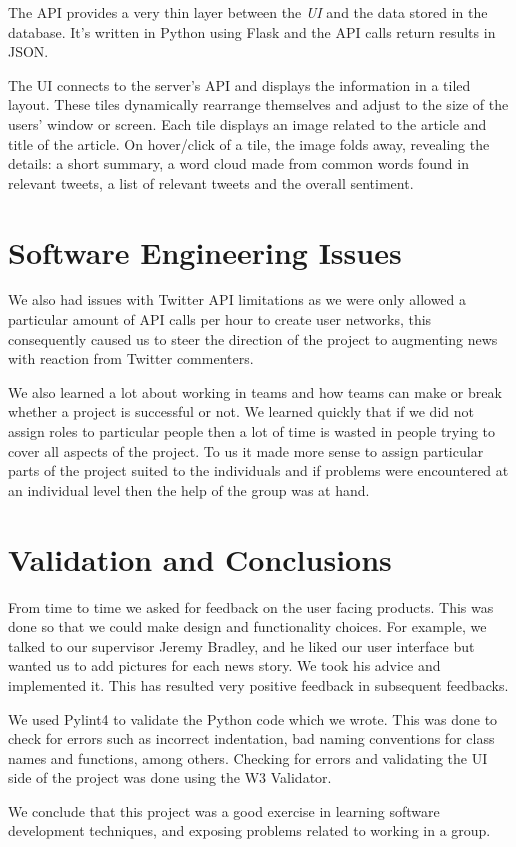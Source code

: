 \documentclass[a4paper,12pt]{article}
\begin{document}
	 The API provides a very thin layer between the \emph{UI} and the data stored in the database. It's written in Python using Flask and the API calls return results in JSON.
	 
	 The UI connects to the server's API and displays the information in a tiled layout. These tiles dynamically rearrange themselves and adjust to the size of the users' window or screen. Each tile displays an image related to the article and title of the article. On hover/click of a tile, the image folds away, revealing the details: a short summary, a word cloud made from common words found in relevant tweets, a list of relevant tweets and the overall sentiment.
  
  \section{Software Engineering Issues}
  
  We also had issues with Twitter API limitations as we were only allowed a particular amount of API calls per hour to create user networks, this consequently caused us to steer the direction of the project to augmenting news with reaction from Twitter commenters.
  
  We also learned a lot about working in teams and how teams can make or break whether a project is successful or not. We learned quickly that if we did not assign roles to particular people then a lot of time is wasted in people trying to cover all aspects of the project. To us it made more sense to assign particular parts of the project suited to the individuals and if problems were encountered at an individual level then the help of the group was at hand.
  
  \section{Validation and Conclusions}
  
	From time to time we asked for feedback on the user facing products. This was done so that we could make design and functionality choices. For example, we talked to our supervisor Jeremy Bradley, and he liked our user interface but wanted us to add pictures for each news story. We took his advice and implemented it. This has resulted very positive feedback in subsequent feedbacks.
	
	We used Pylint4 to validate the Python code which we wrote. This was done to check for errors such as incorrect indentation, bad naming conventions for class names and functions, among others. Checking for errors and validating the UI side of the project was done using the W3 Validator.
	
	We conclude that this project was a good exercise in learning software development techniques, and exposing problems related to working in a group.
  
\end{document}
